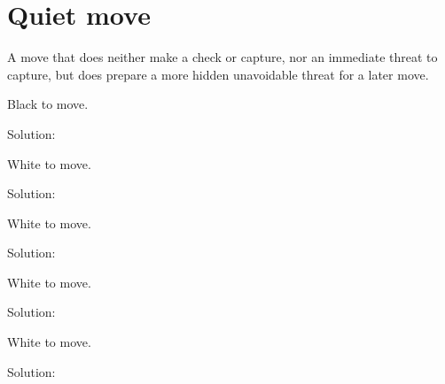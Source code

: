 \documentclass{book}
\begin{document}
\section{Quiet move}
A move that does neither make a check or capture, nor an immediate threat to capture, but does prepare a more hidden unavoidable threat for a later move.\begin{multicols}{2} 
\begin{samepage} 
\newgame 


 
\showboard
 
 Black to move. 
 
Solution: 
 
\end{samepage}\begin{samepage} 
\newgame 


 
\showboard
 
 White to move. 
 
Solution: 
 
\end{samepage}\begin{samepage} 
\newgame 


 
\showboard
 
 White to move. 
 
Solution: 
 
\end{samepage}\begin{samepage} 
\newgame 


 
\showboard
 
 White to move. 
 
Solution: 
 
\end{samepage}\begin{samepage} 
\newgame 


 
\showboard
 
 White to move. 
 
Solution: 
 
\end{samepage}\end{multicols} 
\newpage 
\end{document}
